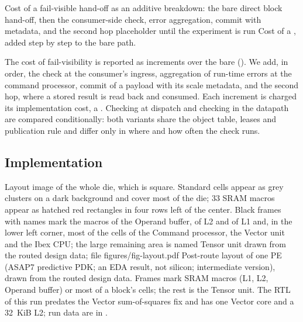 %
  {Cost of a fail-visible hand-off as an additive breakdown: the bare direct block hand-off, then the consumer-side check, error aggregation, commit with metadata, and the second hop}%
  {placeholder until the experiment is run}%
  {Cost of a \failvisible \handoff, added step by step to the bare \armBD path.}

%
The cost of fail-visibility is reported as increments over the bare \armBD \handoff ().
We add, in order, the check at the consumer's ingress, aggregation of run-time errors at the command processor, commit of a payload with its scale metadata, and the second hop, where a stored result is read back and consumed.
Each increment is charged its implementation cost, a \evPostRoute {}.
Checking at dispatch and checking in the datapath are compared conditionally: both variants share the object table, leases and publication rule and differ only in where and how often the check runs.

\subsection{Implementation}\label{sec:res-impl}

%
  {Layout image of the whole die, which is square. Standard cells appear as grey clusters on a dark background and cover most of the die; 33 SRAM macros appear as hatched red rectangles in four rows left of the center. Black frames with names mark the macros of the Operand buffer, of L2 and of L1 and, in the lower left corner, most of the cells of the Command processor, the Vector unit and the Ibex CPU; the large remaining area is named Tensor unit}%
  {drawn from the routed design data; file figures/fig-layout.pdf}%
  {Post-route layout of one PE (ASAP7 predictive PDK; an EDA result, not silicon; intermediate version), drawn from the routed design data. Frames mark SRAM macros (L1, L2, Operand buffer) or most of a block's cells; the rest is the Tensor unit. The RTL of this run predates the Vector sum-of-squares fix and has one Vector core and a 32~KiB L2; run data are in .}

\begin{table}[t]
\centering{}%
\caption{Place-and-route runs: the PE of , and its two units run on their own (ASAP7, post-route; intermediate versions).}\label{tab:layout-runs}

\end{table}


